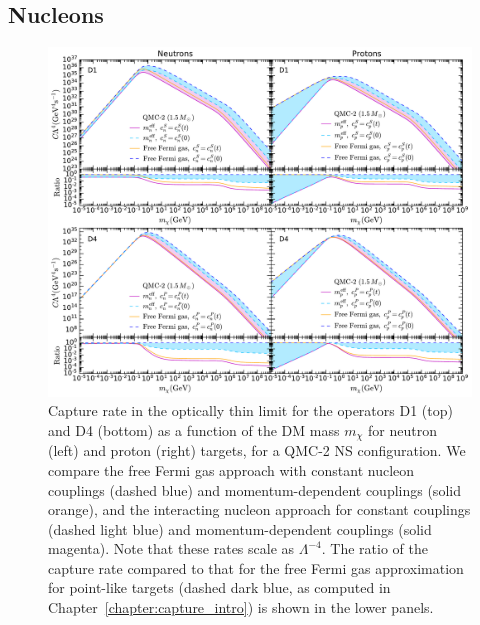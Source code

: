 \subsection{Nucleons}
\label{sec:capresnucleons}

\begin{figure}[t!bp] 
\centering
\includegraphics[width=\textwidth]{capture_3/C_mDM_N_QMC_D1_D4_ratio.pdf}
\caption{
Capture rate in the optically thin limit for the operators D1 (top) and D4 (bottom) as a function of the DM mass $m_\chi$ for neutron (left) and proton (right) targets, for a QMC-2 NS configuration.  We compare the free Fermi gas approach with constant nucleon couplings (dashed blue) and momentum-dependent couplings (solid orange), and the interacting nucleon approach for constant couplings (dashed light blue) and momentum-dependent couplings (solid magenta). Note that these rates scale as $\Lambda^{-4}$. 
The ratio of the capture rate compared to that for the free Fermi gas approximation for point-like targets (dashed dark blue, as computed in Chapter~\ref{chapter:capture_intro}) is shown in the lower panels. 
}
\label{ch5:fig:capratesD1D4}
\end{figure} 

